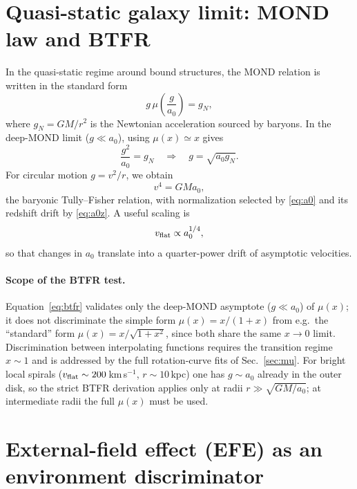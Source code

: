 \documentclass[11pt]{article}
\begin{document}
\section{Quasi-static galaxy limit: MOND law and BTFR}\label{sec:btfr}
In the quasi-static regime around bound structures, the MOND relation is written in the standard form
\begin{equation}
g\,\mu\!\left(\frac{g}{a_0}\right)=g_N,
\label{eq:mondlaw}
\end{equation}
where $g_N=GM/r^2$ is the Newtonian acceleration sourced by baryons. In the deep-MOND limit ($g\ll a_0$), using $\mu(x)\simeq x$ gives
\begin{equation}
\frac{g^2}{a_0}=g_N \quad\Rightarrow\quad g=\sqrt{a_0 g_N}.
\end{equation}
For circular motion $g=v^2/r$, we obtain
\begin{equation}
v^4 = GMa_0,
\label{eq:btfr}
\end{equation}
the baryonic Tully--Fisher relation, with normalization selected by \eqref{eq:a0} and its redshift drift by \eqref{eq:a0z}. A useful scaling is
\begin{equation}
v_{\rm flat}\propto a_0^{1/4},
\label{eq:vscale}
\end{equation}
so that changes in $a_0$ translate into a quarter-power drift of asymptotic velocities.

\paragraph{Scope of the BTFR test.}
Equation~\eqref{eq:btfr} validates only the deep-MOND asymptote
($g\ll a_0$) of $\mu(x)$; it does not discriminate the simple form
$\mu(x)=x/(1+x)$ from e.g.\ the ``standard'' form
$\mu(x)=x/\sqrt{1+x^2}$, since both share the same $x\to 0$ limit.
Discrimination between interpolating functions requires the transition
regime $x\sim 1$ and is addressed by the full rotation-curve fits of
Sec.~\ref{sec:mu}.  For bright local spirals ($v_{\rm flat}\sim
200$\,km\,s$^{-1}$, $r\sim 10$\,kpc) one has $g\sim a_0$ already in the
outer disk, so the strict BTFR derivation applies only at radii $r\gg
\sqrt{GM/a_0}$; at intermediate radii the full $\mu(x)$ must be used.

\section{External-field effect (EFE) as an environment discriminator}\label{sec:efe}
\end{document}

